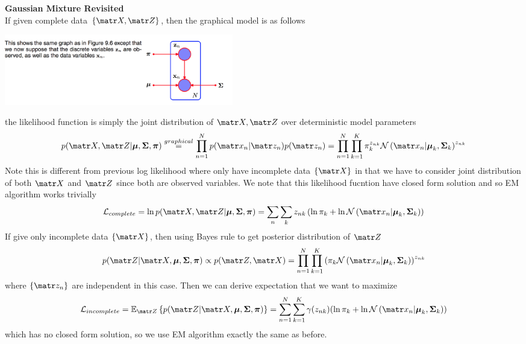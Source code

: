 \documentclass[11pt]{article}
\begin{document}
\begin{defn*}
    \textbf{Gaussian Mixture Revisited} \\ 
    If given complete data $\{\bX, \bZ\}$, then the graphical model is as follows
    \begin{center}
        \includegraphics[width=10cm]{gaussian_mixture_graphical_model_completedata.png}
    \end{center}
    the likelihood function is simply the joint distribution of $\bX, \bZ$ over deterministic model parameters
    \[
        p(\bX, \bZ | \bmu, \bSigma, \bpi)
        \overset{graphical}{=} \prod_{n=1}^N p(\bx_n | \bz_n ) p(\bz_n)
        = \prod_{n=1}^N \prod_{k=1}^K \pi_k^{z_{nk}} \normal{\bx_n | \bmu_k, \bSigma_k}^{z_{nk}}
    \]
    Note this is different from previous log likelihood where only have incomplete data $\{\bX \}$ in that we have to consider joint distribution of both $\bX$ and $\bZ$ since both are observed variables. We note that this likelihood fucntion have closed form solution and so EM algorithm works trivially
    \[
        \mathcal{L}_{complete} 
        = \ln  p(\bX, \bZ | \bmu, \bSigma, \bpi)
        = \sum_n \sum_k z_{nk} 
        \left( 
            \ln \pi_k + \ln \normal{\bx_n | \bmu_k, \bSigma_k}    
        \right)
    \]
    If give only incomplete data $\{\bX\}$, then using Bayes rule to get posterior distribution of $\bZ$ 
    \[
        p(\bZ | \bX, \bmu, \bSigma, \bpi) 
        \propto p(\bZ, \bX)
        = \prod_{n=1}^N \prod_{k=1}^K \left( \pi_k \normal{\bx_n | \bmu_k, \bSigma_k} \right)^{z_{nk}}
    \]
    where $\{\bz_n \}$ are independent in this case. Then we can derive expectation that we want to maximize 
    \[
        \mathcal{L}_{incomplete}
        = \E[\bZ]{p(\bZ | \bX, \bmu, \bSigma, \bpi)}
        = \sum_{n=1}^N \sum_{k=1}^K \gamma(z_{nk})(\ln \pi_k + \ln \normal{\bx_n | \bmu_k, \bSigma_k})
    \]
    which has no closed form solution, so we use EM algorithm exactly the same as before.
\end{defn*}
\end{document}
